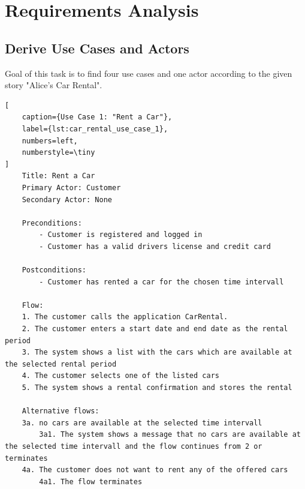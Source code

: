 \label{cha:requirements_analysis}

\section{Requirements Analysis}

\subsection*{Derive Use Cases and Actors}
Goal of this task is to find four use cases and one actor according to the given story "Alice's Car Rental".

\begin{lstlisting}[
    caption={Use Case 1: "Rent a Car"},
    label={lst:car_rental_use_case_1},
    numbers=left,
    numberstyle=\tiny
]
    Title: Rent a Car
    Primary Actor: Customer
    Secondary Actor: None

    Preconditions:
        - Customer is registered and logged in
        - Customer has a valid drivers license and credit card

    Postconditions:
        - Customer has rented a car for the chosen time intervall

    Flow:
    1. The customer calls the application CarRental.
    2. The customer enters a start date and end date as the rental period
    3. The system shows a list with the cars which are available at the selected rental period
    4. The customer selects one of the listed cars
    5. The system shows a rental confirmation and stores the rental

    Alternative flows:
    3a. no cars are available at the selected time intervall
        3a1. The system shows a message that no cars are available at the selected time intervall and the flow continues from 2 or terminates
    4a. The customer does not want to rent any of the offered cars
        4a1. The flow terminates    
\end{lstlisting}



